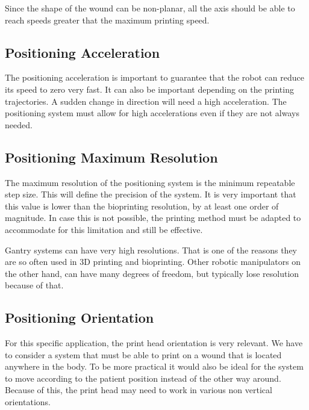 Since the shape of the wound can be non-planar, all the axis should be able to reach speeds greater that the maximum printing speed.


\subsection{Positioning Acceleration}
\label{subsec:system_architecture_requirements_positioning_acceleration}

The positioning acceleration is important to guarantee that the robot can reduce its speed to zero very fast. It can also be important depending on the printing trajectories. A sudden change in direction will need a high acceleration. The positioning system must allow for high accelerations even if they are not always needed.


\subsection{Positioning Maximum Resolution}
\label{subsec:system_architecture_requirements_positioning_max_resolution}

The maximum resolution of the positioning system is the minimum repeatable step size. This will define the precision of the system. It is very important that this value is lower than the bioprinting resolution, by at least one order of magnitude. In case this is not possible, the printing method must be adapted to accommodate for this limitation and still be effective.

Gantry systems can have very high resolutions. That is one of the reasons they are so often used in 3D printing and bioprinting. Other robotic manipulators on the other hand, can have many degrees of freedom, but typically lose resolution because of that.


\subsection{Positioning Orientation}
\label{subsec:system_architecture_requirements_positioning_orientation}

For this specific application, the print head orientation is very relevant. We have to consider a system that must be able to print on a wound that is located anywhere in the body. To be more practical it would also be ideal for the system to move according to the patient position instead of the other way around. Because of this, the print head may need to work in various non vertical orientations.

